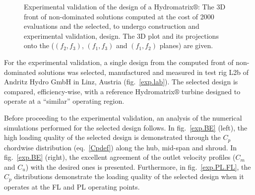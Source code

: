 \begin{figure}[h!]
\begin{minipage}[b]{0.5\linewidth}
\end{minipage}
\begin{minipage}[b]{0.5\linewidth}
 \centering
\end{minipage}
\caption{Experimental validation of the design of a Hydromatrix$\circledR$: The 3D front of non-dominated solutions computed at the cost of 2000 evaluations and the selected, to undergo construction and  experimental validation, design. The 3D plot and its projections onto the ($(f_2,f_3)$, $(f_1,f_3)$ and $(f_1,f_2)$ planes) are given.}
\label{exp.pareto}
\end{figure}

For the experimental validation, a single design from the computed front of non-dominated solutions was selected, manufactured and measured in test rig L2b of Andritz Hydro GmbH in Linz, Austria (fig.\ \ref{exp.lab}). The selected design is compared, efficiency-wise, with a reference Hydromatrix$\circledR$ turbine designed to operate at a ``similar'' operating region.    

Before proceeding to the experimental validation, an analysis of the numerical simulations performed for the selected design follows. In fig.\ \ref{exp.BE} (left), the high loading quality of the selected design is demonstrated through the $C_p$ chordwise distribution (eq.\ \ref{Cpdef}) along the hub, mid-span and shroud. In fig.\ \ref{exp.BE} (right), the excellent agreement of the outlet velocity profiles ($C_m$ and $C_u$) with the desired ones is presented. Furthermore, in fig.\ \ref{exp.PL.FL}, the $C_p$ distributions demonstrate the loading quality of the selected design when it operates at the FL and PL operating points.    

